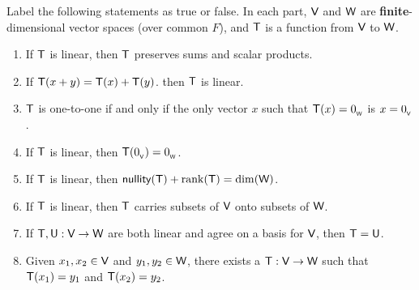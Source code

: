 \exercisesection

\begin{exercise} \label{exercise 2.1.1}
Label the following statements as true or false.
In each part, \(\textsf{V}\) and \(\textsf{W}\) are \textbf{finite}-dimensional vector spaces (over common \(F\)), and \(\textsf{T}\) is a function from \(\textsf{V}\) to \(\textsf{W}\).
\begin{enumerate}
\item If \(\textsf{T}\) is linear, then \(\textsf{T}\) preserves sums and scalar products.
\item If \(\textsf{T}(x + y) = \textsf{T}(x) + \textsf{T}(y)\). then \(\textsf{T}\) is linear.
\item \(\textsf{T}\) is one-to-one if and only if the only vector \(x\) such that \(\textsf{T}(x) = 0_{_{\textsf{W}}}\) is \(x = 0_{_{\textsf{V}}}\).
\item If \(\textsf{T}\) is linear, then \(\textsf{T}(0_{_{\textsf{V}}}) = 0_{_{\textsf{W}}}\).
\item If \(\textsf{T}\) is linear, then \(\textsf{nullity}(\textsf{T}) + \mathrm{rank}(\textsf{T}) = \dim(\textsf{W})\).
\item If \(\textsf{T}\) is linear, then \(\textsf{T}\) carries \LID{} subsets of \(\textsf{V}\) onto \LID{} subsets of \(\textsf{W}\).
\item If \(\textsf{T}, \textsf{U} : \textsf{V} \to \textsf{W}\) are both linear and agree on a basis for \(\textsf{V}\), then \(\textsf{T} = \textsf{U}\).
\item Given \(x_1, x_2 \in \textsf{V}\) and \(y_1, y_2 \in \textsf{W}\), there exists a \LTRAN{} \(\textsf{T} : \textsf{V} \to \textsf{W}\) such that \(\textsf{T}(x_1) = y_1\) and \(\textsf{T}(x_2) = y_2\).
\end{enumerate}
\end{exercise}

